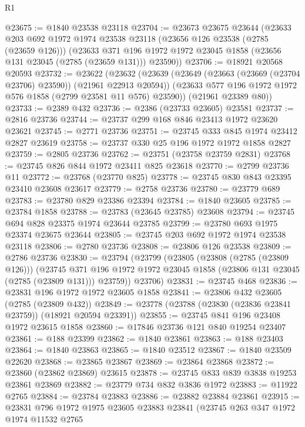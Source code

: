\begin{lexlean}{R1}
\begin{coremodule}
@23675 := @1840 @23538 @23118
@23704 := @23673
    @23675
    @23644
    (@23633
      @203
      @692
      @1972
      @1974
      @23538
      @23118
      (@23656 @126 @23538 (@2785 (@23659 @126)))
      (@23633 @371 @196 @1972 @1972 @23045 @1858 (@23656 @131 @23045 (@2785 (@23659 @131))) @23590))
@23706 := @18921 @20568 @20593
@23732 := @23622
    (@23632
      (@23639
        (@23649 (@23663 (@23669 (@23704 @23706) @23590)) (@21961 @22913 @20594))
        (@23633 @577 @196 @1972 @1972 @576 @1858 (@2799 @23581 @11 @576) @23590))
      (@21961 @23389 @80))
@23733 := @2389 @432
@23736 := @2386 (@23733 @23605) @23581
@23737 := @2816 @23736
@23744 := @23737 @299 @168 @846 @23413 @1972 @23620 @23621
@23745 := @2771 @23736
@23751 := @23745 @333 @845 @1974 @23412 @2827 @23619
@23758 := @23737 @330 @25 @196 @1972 @1972 @1858 @2827
@23759 := @2805 @23736
@23762 := @23751 (@23758 @23759 @2831)
@23768 := @23745 @826 @844 @1972 @23411 @825 @23618
@23770 := @2799 @23736 @11
@23772 := @23768 (@23770 @825)
@23778 := @23745 @830 @843 @23395 @23410 @23608 @23617
@23779 := @2758 @23736
@23780 := @23779 @689
@23783 := @23780 @829 @23386 @23394
@23784 := @1840 @23605
@23785 := @23784 @1858
@23788 := @23783 (@23645 @23785) @23608
@23794 := @23745 @694 @828 @23375 @1974 @23644 @23785
@23799 := @23780 @693 @1975 @23374 @23675 @23644
@23805 := @23745 @203 @692 @1972 @1974 @23538 @23118
@23806 := @2780 @23736
@23808 := @23806 @126 @23538
@23809 := @2786 @23736
@23830 := @23794
    (@23799
      (@23805
        (@23808 (@2785 (@23809 @126)))
        (@23745
          @371
          @196
          @1972
          @1972
          @23045
          @1858
          (@23806 @131 @23045 (@2785 (@23809 @131)))
          @23759))
      @23706)
@23831 := @23745 @468
@23836 := @23831 @196 @1972 @1972 @23605 @1858
@23841 := @23806 @432 @23605 (@2785 (@23809 @432))
@23849 := @23778 (@23788 (@23830 (@23836 @23841 @23759)) (@18921 @20594 @23391))
@23855 := @23745 @841 @196 @23408 @1972 @23615 @1858
@23860 := @17846 @23736 @121 @840 @19254 @23407
@23861 := @188 @23399
@23862 := @1840 @23861
@23863 := @188 @23403
@23864 := @1840 @23863
@23865 := @1840 @23512
@23867 := @1840 @23509 @22620
@23868 := @23865 @23867
@23869 := @23864 @23868
@23872 := @23860 (@23862 @23869) @23615
@23878 := @23745 @833 @839 @3838 @19253 @23861 @23869
@23882 := @23779 @734 @832 @3836 @1972
@23883 := @11922 @2765
@23884 := @23784 @23883
@23886 := @23882 @23884 @23861
@23915 := @23831
    @796
    @1972
    @1975
    @23605
    @23883
    @23841
    (@23745
      @263
      @347
      @1972
      @1974
      @11532
      @2765

\end{coremodule}
\end{lexlean}
